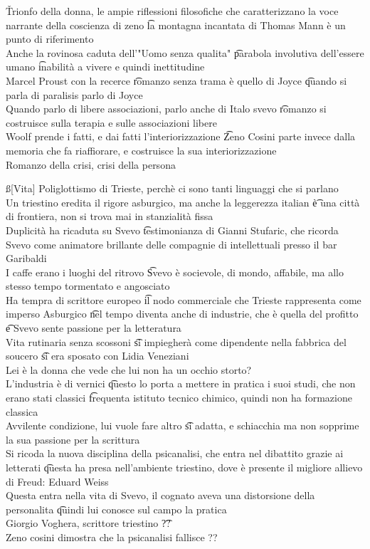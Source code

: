 \documentclass[12pt]{article}
\begin{document}
\v

Trionfo della donna, le ampie riflessioni filosofiche che caratterizzano la voce narrante della coscienza di zeno \t la montagna incantata di Thomas Mann è un punto di riferimento \\
Anche la rovinosa caduta dell'"Uomo senza qualita" \t parabola involutiva dell'essere umano \t inabilità a vivere e quindi inettitudine \\
Marcel Proust con la recerce \t romanzo senza trama è quello di Joyce \t quando si parla di paralisis parlo di Joyce \\
Quando parlo di libere associazioni, parlo anche di Italo svevo \t romanzo si costruisce sulla terapia e sulle associazioni libere \\
Woolf prende i fatti, e dai fatti l'interiorizzazione \t Zeno Cosini parte invece dalla memoria che fa riaffiorare, e costruisce la sua interiorizzazione \\
Romanzo della crisi, crisi della persona

\ss[Vita]
Poliglottismo di Trieste, perchè ci sono tanti linguaggi che si parlano \\
Un triestino eredita il rigore asburgico, ma anche la leggerezza italian \t è una città di frontiera, non si trova mai in stanzialità fissa \\
Duplicità ha ricaduta su Svevo \t testimonianza di Gianni Stufaric, che ricorda Svevo come animatore brillante delle compagnie di intellettuali presso il bar Garibaldi \\
I caffe erano i luoghi del ritrovo \t Svevo è socievole, di mondo, affabile, ma allo stesso tempo tormentato e angosciato \\
Ha tempra di scrittore europeo \t il nodo commerciale che Trieste rappresenta come imperso Asburgico \t nel tempo diventa anche di industrie, che è quella del profitto \t e Svevo sente passione per la letteratura \\
Vita rutinaria senza scossoni \t si impiegherà come dipendente nella fabbrica del soucero \t si era sposato con Lidia Veneziani \\
Lei è la donna che vede che lui non ha un occhio storto? \\
L'industria è di vernici \t questo lo porta a mettere in pratica i suoi studi, che non erano stati classici \t frequenta istituto tecnico chimico, quindi non ha formazione classica \\
Avvilente condizione, lui vuole fare altro \t si adatta, e schiacchia ma non sopprime la sua passione per la scrittura \\
Si ricoda la nuova disciplina della psicanalisi, che entra nel dibattito grazie ai letterati \t questa ha presa nell'ambiente triestino, dove è presente il migliore allievo di Freud: Eduard Weiss \\
Questa entra nella vita di Svevo, il cognato aveva una distorsione della personalita \t quindi lui conosce sul campo la pratica \\
Giorgio Voghera, scrittore triestino \t ?? \\
Zeno cosini dimostra che la psicanalisi fallisce ??
\end{document}
